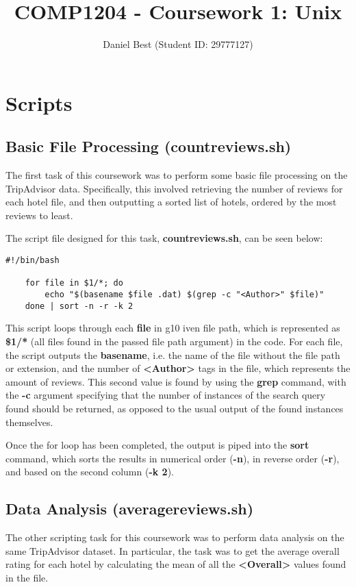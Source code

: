 \documentclass{article}
\title{COMP1204 - Coursework 1: Unix}
\author{Daniel Best (Student ID: 29777127)}
\begin{document}
	
	\maketitle
	
	\newpage
	\section{Scripts}
	
	\subsection{Basic File Processing (countreviews.sh)}
	The first task of this coursework was to perform some basic file processing on the TripAdvisor data. Specifically, this involved retrieving the number of reviews for each hotel file, and then outputting a sorted list of hotels, ordered by the most reviews to least. \newline
	
	\noindent
	The script file designed for this task, \textbf{countreviews.sh}, can be seen below:
	
	\begin{lstlisting}[caption={countreviews.sh}, captionpos=b]
	#!/bin/bash
	
	for file in $1/*; do	
		echo "$(basename $file .dat) $(grep -c "<Author>" $file)"
	done | sort -n -r -k 2
	\end{lstlisting}

	\noindent
	This script loops through each \textbf{file} in g10 iven file path, which is represented as \textbf{\$1/*} (all files found in the passed file path argument) in the code. For each file, the script outputs the \textbf{basename}, i.e. the name of the file without the file path or extension, and the number of \textbf{{\textless}Author\textgreater} tags in the file, which represents the amount of reviews. This second value is found by using the \textbf{grep} command, with the \textbf{-c} argument specifying that the number of instances of the search query found should be returned, as opposed to the usual output of the found instances themselves. \newline
	
	\noindent
	Once the for loop has been completed, the output is piped into the \textbf{sort} command, which sorts the results in numerical order (\textbf{-n}), in reverse order (\textbf{-r}), and based on the second column (\textbf{-k 2}).
	
	\newpage
	\subsection{Data Analysis (averagereviews.sh)}
	The other scripting task for this coursework was to perform data analysis on the same TripAdvisor dataset. In particular, the task was to get the average overall rating for each hotel by calculating the mean of all the \textbf{{\textless}Overall\textgreater} values found in the file. \newline
	
\end{document}
